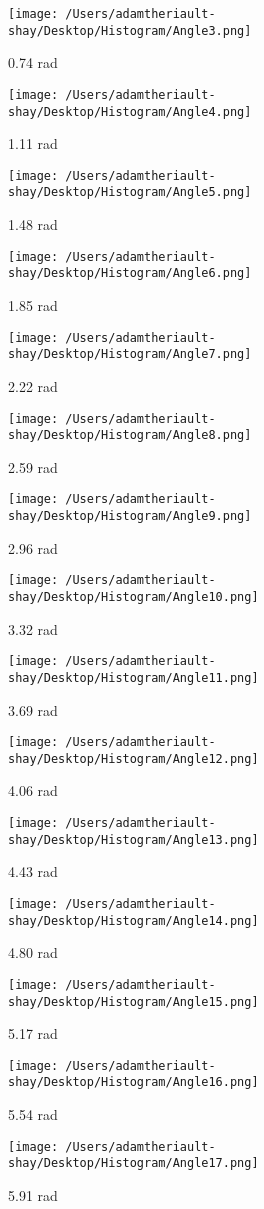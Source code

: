\documentclass[11pt, oneside]{article}   	%
\begin{document}
\newpage
\begin{figure}
\texttt{[image: /Users/adamtheriault-shay/Desktop/Histogram/Angle3.png]}
\caption{0.74 rad}
\texttt{[image: /Users/adamtheriault-shay/Desktop/Histogram/Angle4.png]}
\caption{1.11 rad}
\end{figure}


\newpage
\begin{figure}
\texttt{[image: /Users/adamtheriault-shay/Desktop/Histogram/Angle5.png]}
\caption{1.48 rad}
\texttt{[image: /Users/adamtheriault-shay/Desktop/Histogram/Angle6.png]}
\caption{1.85 rad}
\end{figure}

\newpage
\begin{figure}
\texttt{[image: /Users/adamtheriault-shay/Desktop/Histogram/Angle7.png]}
\caption{2.22 rad}
\texttt{[image: /Users/adamtheriault-shay/Desktop/Histogram/Angle8.png]}
\caption{2.59 rad}
\end{figure}

\newpage
\begin{figure}
\texttt{[image: /Users/adamtheriault-shay/Desktop/Histogram/Angle9.png]}
\caption{2.96 rad}
\texttt{[image: /Users/adamtheriault-shay/Desktop/Histogram/Angle10.png]}
\caption{3.32 rad}
\end{figure}

\newpage
\begin{figure}
\texttt{[image: /Users/adamtheriault-shay/Desktop/Histogram/Angle11.png]}
\caption{3.69 rad}
\texttt{[image: /Users/adamtheriault-shay/Desktop/Histogram/Angle12.png]}
\caption{4.06 rad}
\end{figure}

\newpage
\begin{figure}
\texttt{[image: /Users/adamtheriault-shay/Desktop/Histogram/Angle13.png]}
\caption{4.43 rad}
\texttt{[image: /Users/adamtheriault-shay/Desktop/Histogram/Angle14.png]}
\caption{4.80 rad}
\end{figure}

\newpage
\begin{figure}
\texttt{[image: /Users/adamtheriault-shay/Desktop/Histogram/Angle15.png]}
\caption{5.17 rad}
\texttt{[image: /Users/adamtheriault-shay/Desktop/Histogram/Angle16.png]}
\caption{5.54 rad}
\end{figure}

\newpage
\begin{figure}
\texttt{[image: /Users/adamtheriault-shay/Desktop/Histogram/Angle17.png]}
\caption{5.91 rad}
\end{figure}
\end{document}
